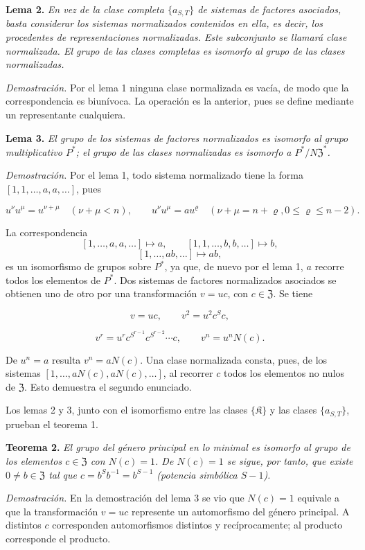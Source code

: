 \noindent\textbf{Lema 2.} \emph{En vez de la clase completa $\{a_{S,T}\}$ de sistemas de factores asociados, basta considerar los sistemas normalizados contenidos en ella, es decir, los procedentes de representaciones normalizadas. Este subconjunto se llamará clase normalizada. El grupo de las clases completas es isomorfo al grupo de las clases normalizadas.}

\noindent\emph{Demostración.} Por el lema 1 ninguna clase normalizada es vacía, de modo que la correspondencia es biunívoca. La operación es la anterior, pues se define mediante un representante cualquiera.

\noindent\textbf{Lema 3.} \emph{El grupo de los sistemas de factores normalizados es isomorfo al grupo multiplicativo $P^*$; el grupo de las clases normalizadas es isomorfo a $P^*/N\mathfrak Z^*$.}

\noindent\emph{Demostración.} Por el lema 1, todo sistema normalizado tiene la forma $[1,1,\ldots,a,a,\ldots]$, pues

\[
u^\nu u^\mu=u^{\nu+\mu}\quad(\nu+\mu<n),
\qquad
u^\nu u^\mu=au^\varrho\quad(\nu+\mu=n+\varrho, 0\leq\varrho\leq n-2).
\]

La correspondencia
\[
[1,\ldots,a,a,\ldots]\mapsto a,
\qquad
[1,1,\ldots,b,b,\ldots]\mapsto b,
\]
\[
[1,\ldots,ab,\ldots]\mapsto ab,
\]
es un isomorfismo de grupos sobre $P^*$, ya que, de nuevo por el lema 1, $a$ recorre todos los elementos de $P^*$. Dos sistemas de factores normalizados asociados se obtienen uno de otro por una transformación $v=uc$, con $c\in\mathfrak Z$. Se tiene

\[
v=uc,\qquad v^2=u^2c^Sc,
\]

\[
v^r=u^rc^{S^{r-1}}c^{S^{r-2}}\cdots c,
\qquad v^n=u^nN(c).
\]

De $u^n=a$ resulta $v^n=aN(c)$. Una clase normalizada consta, pues, de los sistemas $[1,\ldots,aN(c),aN(c),\ldots]$, al recorrer $c$ todos los elementos no nulos de $\mathfrak Z$. Esto demuestra el segundo enunciado.

Los lemas 2 y 3, junto con el isomorfismo entre las clases $\{\mathfrak K\}$ y las clases $\{a_{S,T}\}$, prueban el teorema 1.

\noindent\textbf{Teorema 2.} \emph{El grupo del género principal en lo minimal es isomorfo al grupo de los elementos $c\in\mathfrak Z$ con $N(c)=1$. De $N(c)=1$ se sigue, por tanto, que existe $0\ne b\in\mathfrak Z$ tal que $c=b^Sb^{-1}=b^{S-1}$ (potencia simbólica $S-1$).}

\noindent\emph{Demostración.} En la demostración del lema 3 se vio que $N(c)=1$ equivale a que la transformación $v=uc$ represente un automorfismo del género principal. A distintos $c$ corresponden automorfismos distintos y recíprocamente; al producto corresponde el producto.

